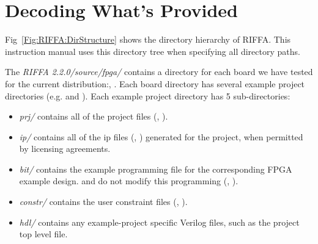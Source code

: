 \documentclass{refrep}
\newcommand{\RIFFAVer}{2.2.0}
\newcommand{\Directory}[1]{\textit{#1}}
\newcommand{\Xilinx}[1]{{\color{red}{#1}}}
\newcommand{\Altera}[1]{{\color{blue}{#1}}}
\begin{document}
\section{Decoding What's Provided}
\label{Sec:Intro:Decoding}
Fig~\ref{Fig:RIFFA:DirStructure} shows the directory hierarchy of RIFFA. This
instruction manual uses this directory tree when specifying all directory paths.

The \Directory{RIFFA \RIFFAVer/source/fpga/} contains a directory for each board
we have tested for the current distribution:\Altera{de5, de4}, \Xilinx{VC709,
  VC707, ZC706}. Each board directory has several example project directories
(e.g. \Altera{DE5Gen1x8If64} and \Xilinx{VC709\_Gen1x8If64}). Each example
project directory has 5 sub-directories:
\begin{itemize}
\item \Directory{prj/} contains all of the project files (\Altera{.qsf,.qpf}, \Xilinx{.xpr}).
\item \Directory{ip/} contains all of the ip files (\Altera{.qsys}, \Xilinx{.xci}) generated for the project, when permitted by licensing agreements.
\item \Directory{bit/} contains the example programming file for the corresponding FPGA example design. \Altera{Quartus} and \Xilinx{Vivado} do not modify this programming (\Altera{.sof}, \Xilinx{.bit}).
\item \Directory{constr/} contains the user constraint files (\Altera{.sdc}, \Xilinx{.xdc}).
\item \Directory{hdl/} contains any example-project specific Verilog files, such as the project top level file.
\end{itemize}
\end{document}
